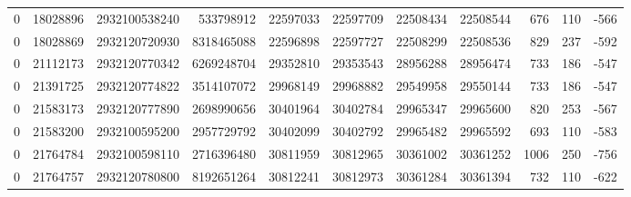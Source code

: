 \begin{tabular}{rrrrrrrrrrr}
0 & 18028896 & 2932100538240 & 533798912 & 22597033 & 22597709 & 22508434 & 22508544 & 676 & 110 & -566 \\
0 & 18028869 & 2932120720930 & 8318465088 & 22596898 & 22597727 & 22508299 & 22508536 & 829 & 237 & -592 \\
0 & 21112173 & 2932120770342 & 6269248704 & 29352810 & 29353543 & 28956288 & 28956474 & 733 & 186 & -547 \\
0 & 21391725 & 2932120774822 & 3514107072 & 29968149 & 29968882 & 29549958 & 29550144 & 733 & 186 & -547 \\
0 & 21583173 & 2932120777890 & 2698990656 & 30401964 & 30402784 & 29965347 & 29965600 & 820 & 253 & -567 \\
0 & 21583200 & 2932100595200 & 2957729792 & 30402099 & 30402792 & 29965482 & 29965592 & 693 & 110 & -583 \\
0 & 21764784 & 2932100598110 & 2716396480 & 30811959 & 30812965 & 30361002 & 30361252 & 1006 & 250 & -756 \\
0 & 21764757 & 2932120780800 & 8192651264 & 30812241 & 30812973 & 30361284 & 30361394 & 732 & 110 & -622 \\
\bottomrule
\end{tabular}
